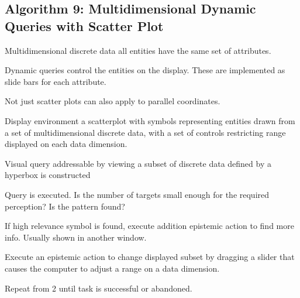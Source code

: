 \begin{mdframed}
\begin{multicols}{2}
\subsection{Algorithm 9: Multidimensional Dynamic Queries with Scatter Plot}
\begin{compactdesc}
\item[Multidimensional discrete data] all entities have the same set of
    attributes.
\item[Dynamic queries] control the entities on the display. These are implemented
    as slide bars for each attribute.
\item[Not just scatter plots] can also apply to parallel coordinates.
\item[Display environment] a scatterplot with symbols representing entities
    drawn from a set of multidimensional discrete data, with a set of
    controls restricting range displayed on each data dimension.
\end{compactdesc}

\midrule\begin{compactenum}
\item Visual query addressable by viewing a subset of discrete data defined
    by a hyperbox is constructed
\item Query is executed.
Is the number of targets small enough for the required perception?
Is the pattern found?
\item If high relevance symbol is found, execute addition epistemic action
    to find more info. Usually shown in another window.
\item Execute an epistemic action to change displayed subset by dragging a
    slider that causes the computer to adjust a range on a data dimension.
\item Repeat from 2 until task is successful or abandoned.
\end{compactenum}

\end{multicols}\end{mdframed}






